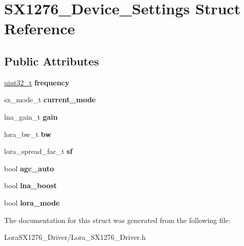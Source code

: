 \hypertarget{structSX1276__Device__Settings}{}\section{S\+X1276\+\_\+\+Device\+\_\+\+Settings Struct Reference}
\label{structSX1276__Device__Settings}
\subsection*{Public Attributes}
\begin{DoxyCompactItemize}
\item 
\mbox{\label{structSX1276__Device__Settings_ab5cbd7ed4ae30a40f158ec1cc8d514b9}} 
\hyperlink{vl53l0x__types_8h_a435d1572bf3f880d55459d9805097f62}{uint32\+\_\+t} {\bfseries frequency}
\item 
\mbox{\label{structSX1276__Device__Settings_a542235bf18620670a163d9ed14cc236e}} 
sx\+\_\+mode\+\_\+t {\bfseries current\+\_\+mode}
\item 
\mbox{\label{structSX1276__Device__Settings_afb23cc9f4ff4dab3d04516b1b9526ad3}} 
lna\+\_\+gain\+\_\+t {\bfseries gain}
\item 
\mbox{\label{structSX1276__Device__Settings_aeb6f4500c8cb90a460ee41d89e16f4be}} 
lora\+\_\+bw\+\_\+t {\bfseries bw}
\item 
\mbox{\label{structSX1276__Device__Settings_abed094aedd81bf74e101f2cea9fdb078}} 
lora\+\_\+spread\+\_\+fac\+\_\+t {\bfseries sf}
\item 
\mbox{\label{structSX1276__Device__Settings_ae4718b250f87774bf09927b9869dd039}} 
bool {\bfseries agc\+\_\+auto}
\item 
\mbox{\label{structSX1276__Device__Settings_a99df0e047763190b007620d58307fd66}} 
bool {\bfseries lna\+\_\+boost}
\item 
\mbox{\label{structSX1276__Device__Settings_a7addcad436fe8ebd40cfb9e8644b0aa4}} 
bool {\bfseries lora\+\_\+mode}
\end{DoxyCompactItemize}


The documentation for this struct was generated from the following file\+:\begin{DoxyCompactItemize}
\item 
Lora\+S\+X1276\+\_\+\+Driver/Lora\+\_\+\+S\+X1276\+\_\+\+Driver.\+h\end{DoxyCompactItemize}
